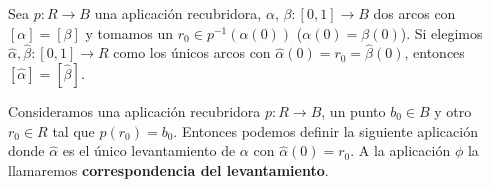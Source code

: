 \begin{coro}
    Sea $p:R\to B$ una aplicación recubridora, $\alpha$, $\beta:[0,1]\to B$ dos arcos con $[\alpha]=[\beta]$ y tomamos un $r_0\in p^{-1}(\alpha(0))$ ($\alpha(0)=\beta(0)$). Si elegimos $\hat{\alpha}, \hat{\beta}:[0,1]\to R$ como los únicos arcos con $\hat{\alpha}(0)=r_0=\hat{\beta}(0)$, entonces $[\hat{\alpha}] = [\hat{\beta}]$.
\end{coro}

\begin{definicion}
    Consideramos una aplicación recubridora $p:R\to B$, un punto $b_0\in B$ y otro $r_0\in R$ tal que $p(r_0)=b_0$. Entonces podemos definir la siguiente aplicación
    donde $\hat{\alpha}$ es el único levantamiento de $\alpha$ con $\hat{\alpha}(0)=r_0$.
    A la aplicación $\phi$ la llamaremos \textbf{correspondencia del levantamiento}.
\end{definicion}

